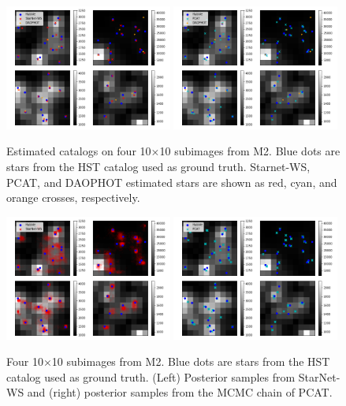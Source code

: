 \begin{figure}[tb]
    \centering
    \includegraphics[width=0.49\textwidth]{figures/m2_results/example_subimages_ws.png}
    \includegraphics[width=0.49\textwidth]{figures/m2_results/example_subimages_pcat.png}
    \caption{Estimated catalogs on four 10$\times$10 subimages from
    M2. Blue dots are stars from the HST catalog used as ground truth. 
    Starnet-WS, PCAT, and DAOPHOT estimated stars are shown as
    red, cyan, and orange crosses, respectively. }
    \label{fig:example_subimages}
\end{figure}

\begin{figure}[tb]
    \centering
    \includegraphics[width=0.49\textwidth]{figures/m2_results/example_subimages_samples_ws.png}
    \includegraphics[width=0.49\textwidth]{figures/m2_results/example_subimages_samples_pcat.png}
    \caption{Four 10$\times$10 subimages from
    M2. Blue dots are stars from the HST catalog used as ground truth. (Left) Posterior samples from StarNet-WS and (right) posterior samples from the MCMC chain of PCAT. }
    \label{fig:example_subimages_sampled}
\end{figure}

